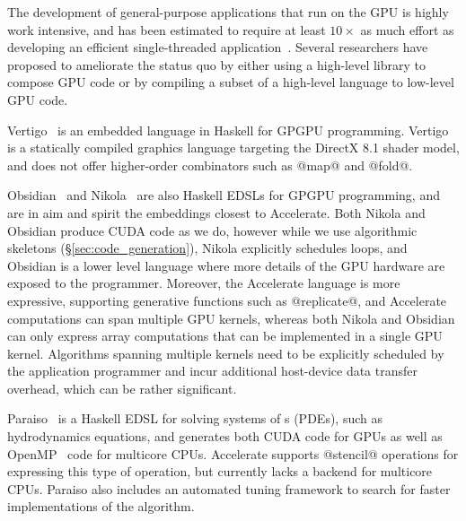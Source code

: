 The development of general-purpose applications that run on the GPU is highly
work intensive, and has been estimated to require at least $10\times$ as much
effort as developing an efficient single-threaded
application~\cite{Sweeney:2009ua}. Several researchers have proposed to
ameliorate the status quo by either using a high-level library to compose GPU
code or by compiling a subset of a high-level language to low-level GPU code.



Vertigo~\cite{Elliott:2004hh} is an embedded language in Haskell for GPGPU
programming. Vertigo is a statically compiled graphics language targeting the
DirectX 8.1 shader model, and does not offer higher-order combinators such as
@map@ and @fold@.

Obsidian~\cite{Svensson:2008a} and Nikola~\cite{Mainland:2010vj} are also
Haskell EDSLs for GPGPU programming, and are in aim and spirit the embeddings
closest to Accelerate. Both Nikola and Obsidian produce CUDA code as we do,
however while we use algorithmic skeletons (\S\ref{sec:code_generation}), Nikola
explicitly schedules loops, and Obsidian is a lower level language where more
details of the GPU hardware are exposed to the programmer. Moreover, the
Accelerate language is more expressive, supporting generative functions such as
@replicate@, and Accelerate computations can span multiple GPU kernels, whereas
both Nikola and Obsidian can only express array computations that can be
implemented in a single GPU kernel. Algorithms spanning multiple kernels need to
be explicitly scheduled by the application programmer and incur additional
host-device data transfer overhead, which can be rather significant.


Paraiso~\cite{Muranushi:2012eh} is a Haskell EDSL for solving systems of
s (PDEs), such as hydrodynamics equations,
and generates both CUDA code for GPUs as well as OpenMP~\cite{OpenMP:2008} code
for multicore CPUs. Accelerate supports @stencil@ operations for expressing this
type of operation, but currently lacks a backend for multicore CPUs. Paraiso
also includes an automated tuning framework to search for faster implementations
of the algorithm.

